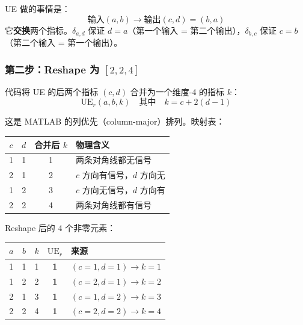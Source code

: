 \documentclass[12pt,a4paper]{article}
\begin{document}
\begin{keybox}
UE 做的事情是：
$$\text{输入} (a, b) \to \text{输出} (c, d) = (b, a)$$
它\textbf{交换}两个指标。$\delta_{a,d}$ 保证 $d=a$（第一个输入 = 第二个输出），$\delta_{b,c}$ 保证 $c=b$（第二个输入 = 第一个输出）。

\begin{center}
\end{center}
\end{keybox}

\subsubsection{第二步：Reshape 为 $[2, 2, 4]$}

代码将 UE 的后两个指标 $(c, d)$ 合并为一个维度-4 的指标 $k$：
$$\text{UE}_r(a, b, k) \quad \text{其中} \quad k = c + 2(d - 1)$$

这是 MATLAB 的列优先（column-major）排列。映射表：

\begin{center}
\begin{tabular}{cc|c|l}
\toprule
$c$ & $d$ & 合并后 $k$ & 物理含义 \\
\midrule
1 & 1 & 1 & 两条对角线都无信号 \\
2 & 1 & 2 & $c$ 方向有信号，$d$ 方向无 \\
1 & 2 & 3 & $c$ 方向无信号，$d$ 方向有 \\
2 & 2 & 4 & 两条对角线都有信号 \\
\bottomrule
\end{tabular}
\end{center}

Reshape 后的 4 个非零元素：

\begin{center}
\begin{tabular}{ccc|c|l}
\toprule
$a$ & $b$ & $k$ & $\text{UE}_r$ & 来源 \\
\midrule
1 & 1 & 1 & \textbf{1} & $(c{=}1,d{=}1) \to k{=}1$ \\
1 & 2 & 2 & \textbf{1} & $(c{=}2,d{=}1) \to k{=}2$ \\
2 & 1 & 3 & \textbf{1} & $(c{=}1,d{=}2) \to k{=}3$ \\
2 & 2 & 4 & \textbf{1} & $(c{=}2,d{=}2) \to k{=}4$ \\
\bottomrule
\end{tabular}
\end{center}
\end{document}
